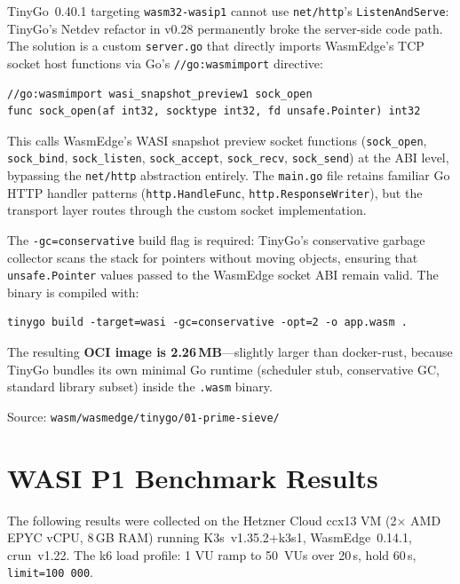 TinyGo~0.40.1 targeting \texttt{wasm32-wasip1} cannot use \texttt{net/http}'s \texttt{ListenAndServe}: TinyGo's Netdev refactor in v0.28 permanently broke the server-side code path. The solution is a custom \texttt{server.go} that directly imports \acs{WasmEdge}'s \acs{TCP} socket host functions via Go's \texttt{//go:wasmimport} directive:

\begin{verbatim}
//go:wasmimport wasi_snapshot_preview1 sock_open
func sock_open(af int32, socktype int32, fd unsafe.Pointer) int32
\end{verbatim}

This calls \acs{WasmEdge}'s \acs{WASI} snapshot preview socket functions (\texttt{sock\_open}, \texttt{sock\_bind}, \texttt{sock\_listen}, \texttt{sock\_accept}, \texttt{sock\_recv}, \texttt{sock\_send}) at the \acs{ABI} level, bypassing the \texttt{net/http} abstraction entirely. The \texttt{main.go} file retains familiar Go \acs{HTTP} handler patterns (\texttt{http.HandleFunc}, \texttt{http.ResponseWriter}), but the transport layer routes through the custom socket implementation.

The \texttt{-gc=conservative} build flag is required: TinyGo's conservative garbage collector scans the stack for pointers without moving objects, ensuring that \texttt{unsafe.Pointer} values passed to the \acs{WasmEdge} socket \acs{ABI} remain valid. The binary is compiled with:

\begin{verbatim}
tinygo build -target=wasi -gc=conservative -opt=2 -o app.wasm .
\end{verbatim}

The resulting \textbf{OCI image is 2.26\,MB}---slightly larger than docker-rust, because TinyGo bundles its own minimal Go runtime (scheduler stub, conservative \acs{GC}, standard library subset) inside the \texttt{.wasm} binary.

Source: \texttt{wasm/wasmedge/tinygo/01-prime-sieve/}

\section{WASI P1 Benchmark Results}
\label{app:wasmedge_results}

The following results were collected on the Hetzner Cloud ccx13 \acs{VM} (2$\times$ AMD EPYC vCPU, 8\,GB RAM) running K3s~v1.35.2+k3s1, WasmEdge~0.14.1, crun~v1.22. The k6 load profile: 1 \acs{VU} ramp to 50~\acp{VU} over 20\,s, hold 60\,s, \texttt{limit=100\,000}.

